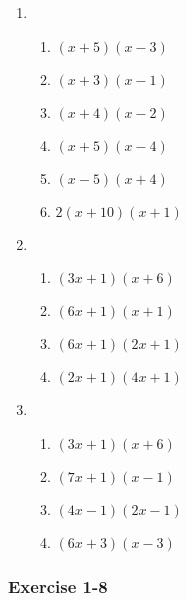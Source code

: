 {\begin{multicols}{3}
\begin{enumerate}[noitemsep, label=\textbf{\arabic*}. ]
\item %

\begin{enumerate}[noitemsep, label=\textbf{(\alph*)} ]  
\item $(x + 5)(x - 3)$%
\item $(x + 3)(x - 1)$%
\item $(x + 4)(x - 2)$%
\item $(x + 5)(x - 4)$%
\item $(x - 5)(x + 4)$%
\item $2(x + 10)(x + 1)$%
\end{enumerate}



\item %

\begin{enumerate}[noitemsep, label=\textbf{(\alph*)} ] 


\item $(3x + 1)(x + 6)$%
\item $(6x + 1)(x + 1)$%
\item $(6x + 1)(2x + 1)$%
\item $(2x + 1)(4x + 1)$%
\end{enumerate}


\item %

\begin{enumerate}[noitemsep, label=\textbf{(\alph*)} ] 
\item $(3x + 1)(x + 6)$%
\item $(7x + 1)(x - 1)$%
\item $(4x - 1)(2x - 1)$%
\item $(6x + 3)(x - 3)$%
\end{enumerate}

\end{enumerate}

\subsubsection*{Exercise 1-8} %



\end{multicols}}
